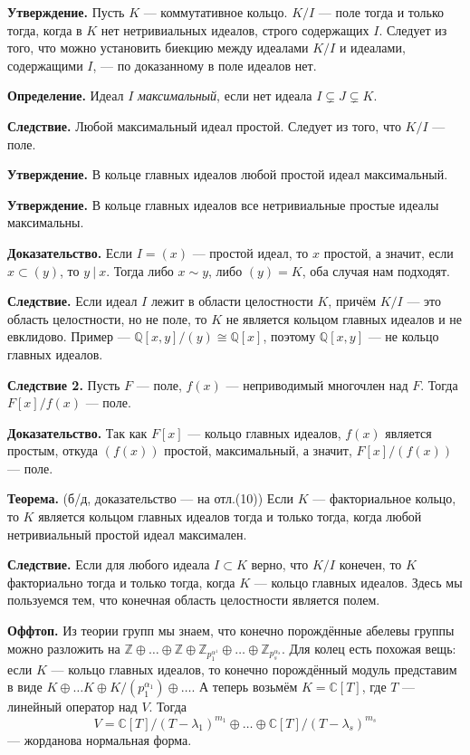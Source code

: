 \QED

\textbf{Утверждение.} Пусть $K$ --- коммутативное кольцо.
$K/I$ --- поле тогда и только тогда, когда в $K$ нет нетривиальных идеалов, строго содержащих $I$.
Следует из того, что можно установить биекцию между идеалами $K/I$ и идеалами, содержащими $I$, --- по доказанному в поле идеалов нет.

\textbf{Определение.} Идеал $I$ \textit{максимальный}, если нет идеала $I \subsetneq J \subsetneq K$.

\textbf{Следствие.} Любой максимальный идеал простой.
Следует из того, что $K/I$ --- поле.

\textbf{Утверждение.} В кольце главных идеалов любой простой идеал максимальный.

\textbf{Утверждение.} В кольце главных идеалов все нетривиальные простые идеалы максимальны.

\textbf{Доказательство.} Если $I = (x)$ --- простой идеал, то $x$ простой, а значит, если $x \subset (y)$, то $y~|~x$.
Тогда либо $x \sim y$, либо $(y) = K$, оба случая нам подходят.

\QED

\textbf{Следствие.} Если идеал $I$ лежит в области целостности $K$, причём $K/I$ --- это область целостности, но не поле, то $K$ не является кольцом главных идеалов и не евклидово.
Пример --- $\mathbb Q[x, y] / (y) \cong \mathbb Q[x]$, поэтому $\mathbb Q[x, y]$ --- не кольцо главных идеалов.

\textbf{Следствие 2.} Пусть $F$ --- поле, $f(x)$ --- неприводимый многочлен над $F$.
Тогда $F[x] / f(x)$ --- поле.

\textbf{Доказательство.} Так как $F[x]$ --- кольцо главных идеалов, $f(x)$ является простым, откуда $(f(x))$ простой, максимальный, а значит, $F[x] / (f(x))$ --- поле.

\QED

\textbf{Теорема.} (б/д, доказательство --- на отл.(10)) Если $K$ --- факториальное кольцо, то $K$ является кольцом главных идеалов тогда и только тогда, когда любой нетривиальный простой идеал максимален.

\textbf{Следствие.} Если для любого идеала $I \subset K$ верно, что $K/I$ конечен, то $K$ факториально тогда и только тогда, когда $K$ --- кольцо главных идеалов.
Здесь мы пользуемся тем, что конечная область целостности является полем.

\textbf{Оффтоп.} Из теории групп мы знаем, что конечно порождённые абелевы группы можно разложить на $\mathbb Z \oplus \dots \oplus \mathbb Z \oplus \mathbb Z_{p_1^{\alpha^1}} \oplus \dots \oplus \mathbb Z_{p_s^{\alpha_s}}$.
Для колец есть похожая вещь: если $K$ --- кольцо главных идеалов, то конечно порождённый модуль представим в виде $K \oplus \dots K \oplus K/(p_1^{\alpha_1}) \oplus \dots$.
А теперь возьмём $K = \mathbb C[T]$, где $T$ --- линейный оператор над $V$.
Тогда
\[
    V = \mathbb C[T] / (T - \lambda_1)^{m_1} \oplus \dots \oplus \mathbb C[T]/(T - \lambda_s)^{m_s}
\]
--- жорданова нормальная форма.

